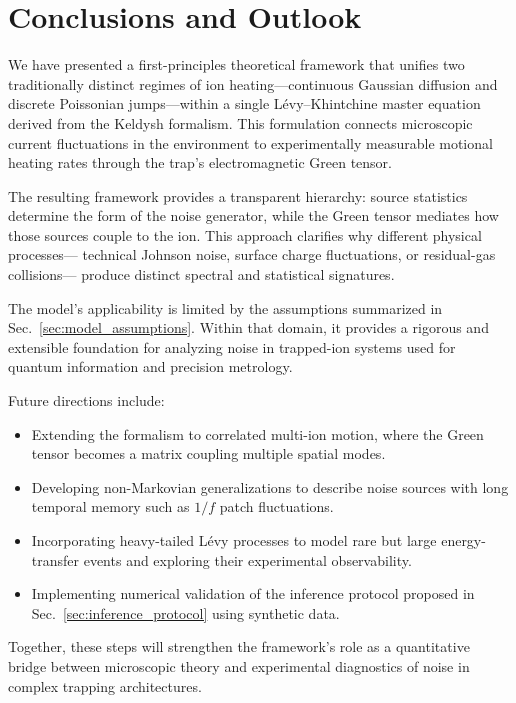 \section{Conclusions and Outlook}
\label{sec:conclusion}

We have presented a first-principles theoretical framework that unifies
two traditionally distinct regimes of ion heating---continuous Gaussian diffusion
and discrete Poissonian jumps---within a single L\'evy--Khintchine master equation
derived from the Keldysh formalism.
This formulation connects microscopic current fluctuations in the environment
to experimentally measurable motional heating rates through the trap's
electromagnetic Green tensor.

The resulting framework provides a transparent hierarchy:
source statistics determine the form of the noise generator,
while the Green tensor mediates how those sources couple to the ion.
This approach clarifies why different physical processes---
technical Johnson noise, surface charge fluctuations, or residual-gas collisions---
produce distinct spectral and statistical signatures.

The model's applicability is limited by the assumptions summarized in
Sec.~\ref{sec:model_assumptions}.
Within that domain, it provides a rigorous and extensible foundation
for analyzing noise in trapped-ion systems used for quantum information
and precision metrology.

Future directions include:
\begin{itemize}
  \item Extending the formalism to correlated multi-ion motion,
        where the Green tensor becomes a matrix coupling multiple spatial modes.
  \item Developing non-Markovian generalizations to describe noise sources
        with long temporal memory such as \(1/f\) patch fluctuations.
  \item Incorporating heavy-tailed L\'evy processes to model rare but large
        energy-transfer events and exploring their experimental observability.
  \item Implementing numerical validation of the inference protocol
        proposed in Sec.~\ref{sec:inference_protocol} using synthetic data.
\end{itemize}

Together, these steps will strengthen the framework's role as a quantitative bridge
between microscopic theory and experimental diagnostics of noise
in complex trapping architectures.
